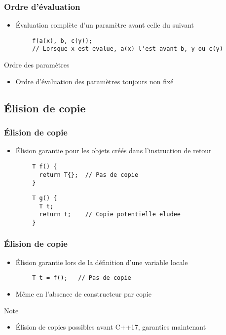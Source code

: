 \documentclass[C++.tex]{subfiles}
\begin{document}
\begin{frame}[fragile]
	\frametitle{Ordre d'évaluation}
	\begin{itemize}
		\item Évaluation complète d'un paramètre avant celle du suivant
	\end{itemize}

	\begin{verbatim}
		f(a(x), b, c(y));
		// Lorsque x est evalue, a(x) l'est avant b, y ou c(y)
	\end{verbatim}

	\begin{alertblock}{Ordre des paramètres}
		\begin{itemize}
			\item Ordre d'évaluation des paramètres toujours non fixé
		\end{itemize}
	\end{alertblock}
\end{frame}

\subsection*{Élision de copie}
\begin{frame}[fragile]
	\frametitle{Élision de copie}
	\begin{itemize}
		\item Élision garantie pour les objets créés dans l'instruction de retour
	\end{itemize}

	\begin{verbatim}
		T f() {
		  return T{};  // Pas de copie
		}
	\end{verbatim}

	\begin{verbatim}
		T g() {
		  T t;
		  return t;    // Copie potentielle eludee
		}
	\end{verbatim}

\end{frame}

\begin{frame}[fragile]
	\frametitle{Élision de copie}
	\begin{itemize}
		\item Élision garantie lors de la définition d'une variable locale
	\end{itemize}

	\begin{verbatim}
		T t = f();   // Pas de copie
	\end{verbatim}

	\begin{itemize}
		\item Même en l'absence de constructeur par copie
	\end{itemize}

	\begin{block}{Note}
		\begin{itemize}
			\item Élision de copies possibles avant C++17, garanties maintenant
		\end{itemize}
	\end{block}
\end{frame}
\end{document}

